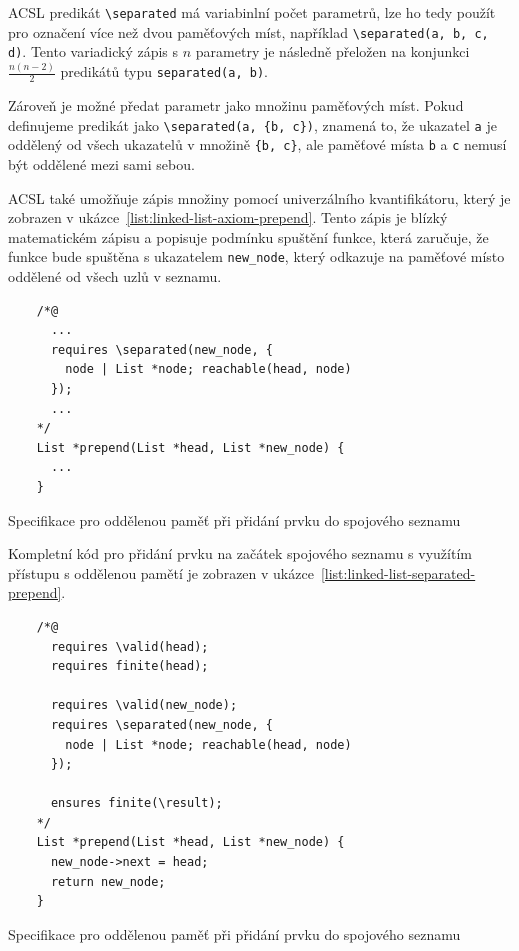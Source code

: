 ACSL predikát \texttt{\textbackslash separated} má variabinlní počet parametrů,
lze ho tedy použít pro označení více než dvou paměťových míst, například
\texttt{\textbackslash separated(a, b, c, d)}.
Tento variadický zápis s $n$ parametry
je následně přeložen na konjunkci $\frac{n(n-2)}{2}$ predikátů typu \texttt{separated(a, b)}.

Zároveň je možné předat parametr jako množinu paměťových míst.
Pokud definujeme predikát jako \texttt{\textbackslash separated(a, \{b, c\})},
znamená to, že ukazatel \texttt{a} je oddělený od všech ukazatelů v množině \texttt{\{b, c\}},
ale paměťové místa \texttt{b} a \texttt{c} nemusí být oddělené mezi sami sebou.

ACSL také umožňuje zápis množiny pomocí univerzálního kvantifikátoru,
který je zobrazen v ukázce~\ref{list:linked-list-axiom-prepend}.
Tento zápis je blízký matematickém zápisu a popisuje podmínku spuštění funkce,
která zaručuje, že funkce bude spuštěna s ukazatelem \texttt{new\_node},
který odkazuje na paměťové místo oddělené od všech uzlů v seznamu.

\begin{listing}[H]
    \begin{verbatim}
    /*@
      ...
      requires \separated(new_node, {
        node | List *node; reachable(head, node)
      });
      ...
    */
    List *prepend(List *head, List *new_node) {
      ...
    }
    \end{verbatim}
    \caption{Specifikace pro oddělenou paměť při přidání prvku do spojového seznamu}
    \label{list:linked-list-axiom-prepend}
\end{listing}

Kompletní kód pro přidání prvku na začátek spojového seznamu
s využítím přístupu s oddělenou pamětí je zobrazen v ukázce~\ref{list:linked-list-separated-prepend}.

\begin{listing}[H]
    \begin{verbatim}
    /*@
      requires \valid(head);
      requires finite(head);

      requires \valid(new_node);
      requires \separated(new_node, {
        node | List *node; reachable(head, node)
      });

      ensures finite(\result);
    */
    List *prepend(List *head, List *new_node) {
      new_node->next = head;
      return new_node;
    }
    \end{verbatim}
    \caption{Specifikace pro oddělenou paměť při přidání prvku do spojového seznamu}
    \label{list:linked-list-separated-prepend}
\end{listing}

